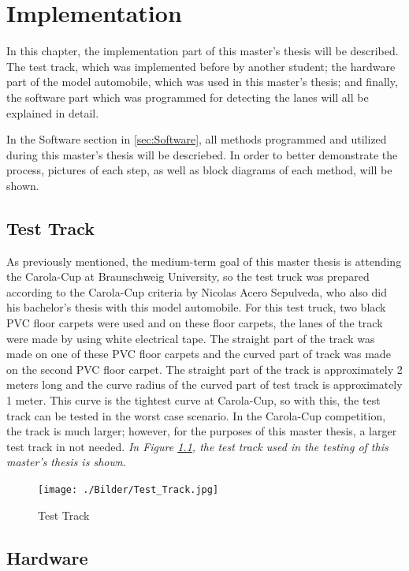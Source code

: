 %
\chapter{Implementation}\label{cha:Implementation}
%
In this chapter, the implementation part of this master's thesis will be described. The test track, which was implemented before by another student; the hardware part of the model automobile, which was used in this master's thesis; and finally, the software part which was programmed for detecting the lanes will all be  explained in detail.

In the Software section in \ref{sec:Software}, all methods programmed and utilized during this master's thesis will be descriebed. In order to better demonstrate the process, pictures of each step, as well as block diagrams of each method, will be shown.

%
\section{Test Track}\label{sec:Test Track}

As previously mentioned, the medium-term goal of this master thesis is attending the Carola-Cup at Braunschweig University, so the test truck was prepared according to the Carola-Cup criteria by Nicolas Acero Sepulveda, who also did his bachelor's thesis with this model automobile. For this test truck, two black PVC floor carpets were used and on these floor carpets, the lanes of the track were made by using white electrical tape. The straight part of the track was made on one of these PVC floor carpets and the curved part of track was made on the second PVC floor carpet. The straight part of the track is approximately 2 meters long and the curve radius of the curved part of test track is approximately 1 meter. This curve is the tightest curve at Carola-Cup, so with this, the test track can be tested in the worst case scenario. In the Carola-Cup competition, the track is much larger; however, for the purposes of this master thesis, a larger test track in not needed. \emph{\color{blue}In Figure \ref{fig:Test_Track}, the test track used in the testing of this master's thesis is shown.}


\begin{figure}[H]
	\centering
		\texttt{[image: ./Bilder/Test\_Track.jpg]}
	\caption{Test Track}
	\label{fig:Test_Track}
\end{figure}



%
\section{Hardware}\label{sec:Hardware}



